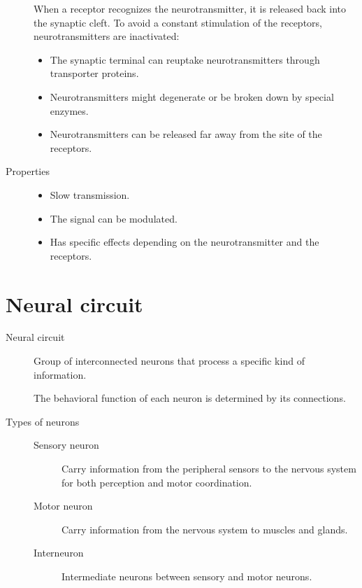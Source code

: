 \begin{description}
        When a receptor recognizes the neurotransmitter, it is released back into the synaptic cleft.
        To avoid a constant stimulation of the receptors, neurotransmitters are inactivated:
        \begin{itemize}
            \item The synaptic terminal can reuptake neurotransmitters through transporter proteins.
            \item Neurotransmitters might degenerate or be broken down by special enzymes.
            \item Neurotransmitters can be released far away from the site of the receptors.
        \end{itemize}

    \item[Properties] \phantom{}
        \begin{itemize}
            \item Slow transmission.
            \item The signal can be modulated.
            \item Has specific effects depending on the neurotransmitter and the receptors.
        \end{itemize}
\end{description}



\section{Neural circuit}

\begin{description}
    \item[Neural circuit] 
        Group of interconnected neurons that process a specific kind of information.

        \begin{remark}
            The behavioral function of each neuron is determined by its connections.
        \end{remark}

    \item[Types of neurons] \phantom{}
        \begin{description}
            \item[Sensory neuron] 
                Carry information from the peripheral sensors to the nervous system for both perception and motor coordination.
        
            \item[Motor neuron] 
                Carry information from the nervous system to muscles and glands.
            
            \item[Interneuron] 
                Intermediate neurons between sensory and motor neurons.
        \end{description}
\end{description}

